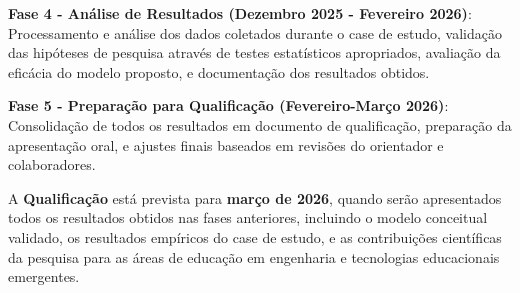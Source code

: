 \documentclass[12pt,a4paper]{article}
\begin{document}
\textbf{Fase 4 - Análise de Resultados (Dezembro 2025 - Fevereiro 2026)}: Processamento e análise dos dados coletados durante o case de estudo, validação das hipóteses de pesquisa através de testes estatísticos apropriados, avaliação da eficácia do modelo proposto, e documentação dos resultados obtidos.

\textbf{Fase 5 - Preparação para Qualificação (Fevereiro-Março 2026)}: Consolidação de todos os resultados em documento de qualificação, preparação da apresentação oral, e ajustes finais baseados em revisões do orientador e colaboradores.

A \textbf{Qualificação} está prevista para \textbf{março de 2026}, quando serão apresentados todos os resultados obtidos nas fases anteriores, incluindo o modelo conceitual validado, os resultados empíricos do case de estudo, e as contribuições científicas da pesquisa para as áreas de educação em engenharia e tecnologias educacionais emergentes.

\def\refname{REFERÊNCIAS BIBLIOGRÁFICAS}


\end{document}
